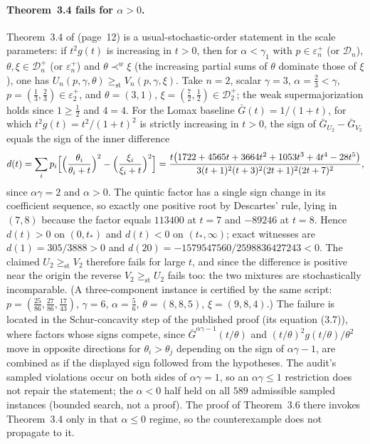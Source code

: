 \documentclass[10pt]{article}
\theoremstyle{plain}
\theoremstyle{definition}
\theoremstyle{remark}
\newcommand{\st}{\mathrm{st}}
\begin{document}
\paragraph{Theorem~3.4 fails for $\alpha>0$.} Theorem~3.4 of \cite{SahooKayalFinkelstein2026} (page~12) is a usual-stochastic-order statement in the scale parameters: if $t^2g(t)$ is increasing in $t>0$, then for $\alpha<\gamma_1$ with $p\in\varepsilon_n^+$ (or $\mathcal D_n$), $\theta,\xi\in\mathcal D_n^+$ (or $\varepsilon_n^+$) and $\theta\prec^w\xi$ (the increasing partial sums of $\theta$ dominate those of $\xi$), one has $U_n(p,\gamma,\theta)\ge_{\st}V_n(p,\gamma,\xi)$. Take $n=2$, scalar $\gamma=3$, $\alpha=\tfrac23<\gamma$, $p=(\tfrac13,\tfrac23)\in\varepsilon_2^+$, and $\theta=(3,1)$, $\xi=(\tfrac72,\tfrac12)\in\mathcal D_2^+$; the weak supermajorization holds since $1\ge\tfrac12$ and $4=4$. For the Lomax baseline $\bar G(t)=1/(1+t)$, for which $t^2g(t)=t^2/(1+t)^2$ is strictly increasing in $t>0$, the sign of $\bar G_{U_2}-\bar G_{V_2}$ equals the sign of the inner difference
\begin{equation}\label{eq:thm34}
d(t)=\sum_i p_i\Bigl[\Bigl(\frac{\theta_i}{\theta_i+t}\Bigr)^{2}-\Bigl(\frac{\xi_i}{\xi_i+t}\Bigr)^{2}\Bigr]
=\frac{t\bigl(1722+4565t+3664t^{2}+1053t^{3}+4t^{4}-28t^{5}\bigr)}{3(t+1)^{2}(t+3)^{2}(2t+1)^{2}(2t+7)^{2}},
\end{equation}
since $\alpha\gamma=2$ and $\alpha>0$. The quintic factor has a single sign change in its coefficient sequence, so exactly one positive root by Descartes' rule, lying in $(7,8)$ because the factor equals $113400$ at $t=7$ and $-89246$ at $t=8$. Hence $d(t)>0$ on $(0,t_*)$ and $d(t)<0$ on $(t_*,\infty)$; exact witnesses are $d(1)=305/3888>0$ and $d(20)=-1579547560/2598836427243<0$. The claimed $U_2\ge_{\st}V_2$ therefore fails for large $t$, and since the difference is positive near the origin the reverse $V_2\ge_{\st}U_2$ fails too: the two mixtures are stochastically incomparable. (A three-component instance is certified by the same script: $p=(\tfrac{25}{86},\tfrac{27}{86},\tfrac{17}{43})$, $\gamma=6$, $\alpha=\tfrac56$, $\theta=(8,8,5)$, $\xi=(9,8,4)$.) The failure is located in the Schur-concavity step of the published proof (its equation (3.7)), where factors whose signs compete, since $\bar G^{\alpha\gamma-1}(t/\theta)$ and $(t/\theta)^2g(t/\theta)/\theta^2$ move in opposite directions for $\theta_i>\theta_j$ depending on the sign of $\alpha\gamma-1$, are combined as if the displayed sign followed from the hypotheses. The audit's sampled violations occur on both sides of $\alpha\gamma=1$, so an $\alpha\gamma\le1$ restriction does not repair the statement; the $\alpha<0$ half held on all $589$ admissible sampled instances (bounded search, not a proof). The proof of Theorem~3.6 there invokes Theorem~3.4 only in that $\alpha\le0$ regime, so the counterexample does not propagate to it.
\end{document}
